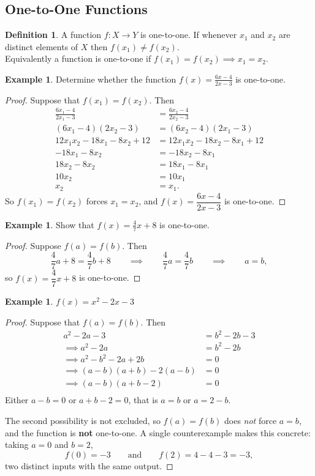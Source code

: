 \documentclass[11pt,a4paper]{article}
\theoremstyle{definition}
\newtheorem{definition}[thm]{Definition}
\newtheorem{example}[thm]{Example}
\begin{document}
\subsection{One-to-One Functions}
\begin{definition}
 A function $f:X\longrightarrow Y$ is one-to-one. If whenever $x_1$ and $x_2$ are distinct elements of $X$ then $f(x_1)\neq f(x_2)$.\\

Equivalently a function is one-to-one if $f(x_1)=f(x_2)\implies x_1=x_2$.
\end{definition}
\begin{example}

Determine whether the function $f(x)=\frac{6x-4}{2x-3}$ is one-to-one.
\end{example}
\begin{proof}

Suppose that $f(x_1)=f(x_2).$ Then
\begin{align*}
\frac{6x_1-4}{2x_1-3} & = \frac{6x_2-4}{2x_2-3}\\
(6x_1-4)(2x_2-3) & = (6x_2-4)(2x_1-3)\\
12x_1x_2-18x_1-8x_2+12 & = 12x_1x_2-18x_2-8x_1+12\\
-18x_1-8x_2 & = -18x_2-8x_1\\
18x_2-8x_2 & = 18x_1-8x_1\\
10x_2 & = 10x_1\\
x_2 & = x_1 .
\end{align*}
So $f(x_1)=f(x_2)$ forces $x_1=x_2$, and $f(x)=\dfrac{6x-4}{2x-3}$ is
one-to-one.
\end{proof}
\begin{example}
Show that $f(x)=\frac{4}{7}x+8$ is one-to-one.
\end{example}

\begin{proof}
Suppose $f(a)=f(b)$. Then
$$\frac{4}{7}a+8=\frac{4}{7}b+8
\qquad\implies\qquad \frac{4}{7}a=\frac{4}{7}b
\qquad\implies\qquad a=b,$$
so $f(x)=\dfrac{4}{7}x+8$ is one-to-one.
\end{proof}

\begin{example}
$f(x)=x^2-2x-3$
\end{example}

\begin{proof}
Suppose that $f(a)=f(b)$. Then
\begin{align*}
a^2-2a-3 & = b^2-2b-3\\
\implies a^2-2a & = b^2-2b\\
\implies a^2-b^2-2a+2b & =0\\
\implies (a-b)(a+b)-2(a-b) & = 0\\
\implies (a-b)(a+b-2) &=0\\
\end{align*}
Either $a-b=0$ or $a+b-2=0$, that is $a=b$ or $a=2-b$.

The second possibility is not excluded, so $f(a)=f(b)$ does \emph{not} force
$a=b$, and the function is \textbf{not} one-to-one. A single counterexample makes
this concrete: taking $a=0$ and $b=2$,
$$f(0)=-3 \qquad \text{and}\qquad  f(2)=4-4-3=-3,$$
two distinct inputs with the same output.
\end{proof}
\end{document}

